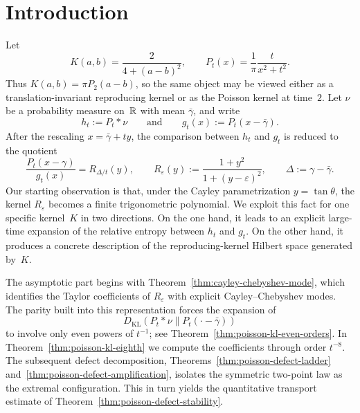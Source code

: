 \section{Introduction}\label{sec:introduction}

Let
\[
K(a,b)=\frac{2}{4+(a-b)^2},
\qquad
P_t(x)=\frac{1}{\pi}\frac{t}{x^2+t^2}.
\]
Thus $K(a,b)=\pi P_2(a-b)$, so the same object may be viewed either as a
translation-invariant reproducing kernel or as the Poisson kernel at
time~$2$.  Let $\nu$ be a probability measure on~$\mathbb{R}$ with mean
$\bar\gamma$, and write
\[
h_t:=P_t*\nu
\qquad\text{and}\qquad
g_t(x):=P_t(x-\bar\gamma).
\]
After the rescaling $x=\bar\gamma+ty$, the comparison between $h_t$ and
$g_t$ is reduced to the quotient
\[
\frac{P_t(x-\gamma)}{g_t(x)}
=R_{\Delta/t}(y),
\qquad
R_\varepsilon(y):=\frac{1+y^2}{1+(y-\varepsilon)^2},
\qquad
\Delta:=\gamma-\bar\gamma.
\]
Our starting observation is that, under the Cayley parametrization
$y=\tan\theta$, the kernel $R_\varepsilon$ becomes a finite
trigonometric polynomial.  We exploit this fact for one specific
kernel~$K$ in two directions.  On the one hand, it leads to an
explicit large-time expansion of the relative entropy between $h_t$ and
$g_t$.  On the other hand, it produces a concrete description of the
reproducing-kernel Hilbert space generated by~$K$.

The asymptotic part begins with
Theorem~\ref{thm:cayley-chebyshev-mode}, which identifies the Taylor
coefficients of $R_\varepsilon$ with explicit Cayley--Chebyshev modes.
The parity built into this representation forces the expansion of
\[
D_{\mathrm{KL}}(P_t*\nu\|P_t(\cdot-\bar\gamma))
\]
to involve only even powers of $t^{-1}$; see
Theorem~\ref{thm:poisson-kl-even-orders}.  In
Theorem~\ref{thm:poisson-kl-eighth} we compute the coefficients through
order $t^{-8}$.  The subsequent defect decomposition,
Theorems~\ref{thm:poisson-defect-ladder}
and~\ref{thm:poisson-defect-amplification}, isolates the symmetric
two-point law as the extremal configuration.  This in turn yields the
quantitative transport estimate of
Theorem~\ref{thm:poisson-defect-stability}.


